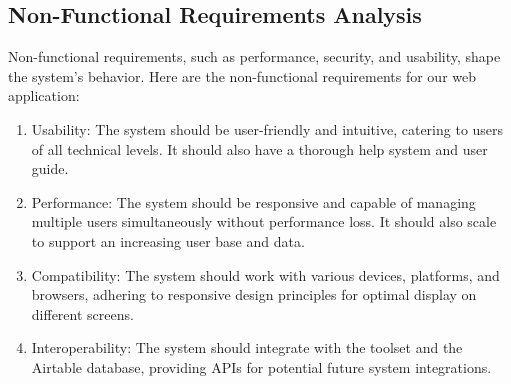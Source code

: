 
\subsection{Non-Functional Requirements Analysis}
Non-functional requirements, such as performance, security, and usability, shape the system's behavior. Here are the non-functional requirements for our web application:

\begin{enumerate}
\item Usability: The system should be user-friendly and intuitive, catering to users of all technical levels. It should also have a thorough help system and user guide.
\item Performance: The system should be responsive and capable of managing multiple users simultaneously without performance loss. It should also scale to support an increasing user base and data.
\item Compatibility: The system should work with various devices, platforms, and browsers, adhering to responsive design principles for optimal display on different screens.
\item Interoperability: The system should integrate with the  toolset and the Airtable database, providing APIs for potential future system integrations.
\end{enumerate}



